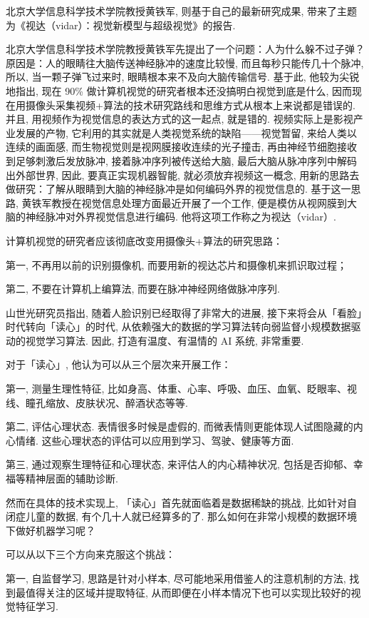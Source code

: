 北京大学信息科学技术学院教授黄铁军, 则基于自己的最新研究成果, 带来了主题为《视达（vidar）：视觉新模型与超级视觉》的报告.


北京大学信息科学技术学院教授黄铁军先提出了一个问题：人为什么躲不过子弹？原因是：人的眼睛往大脑传送神经脉冲的速度比较慢, 而且每秒只能传几十个脉冲, 所以, 当一颗子弹飞过来时, 眼睛根本来不及向大脑传输信号.
基于此, 他较为尖锐地指出, 现在 90\% 做计算机视觉的研究者根本还没搞明白视觉到底是什么, 因而现在用摄像头采集视频+算法的技术研究路线和思维方式从根本上来说都是错误的. 并且, 用视频作为视觉信息的表达方式的这一起点, 就是错的.
视频实际上是影视产业发展的产物, 它利用的其实就是人类视觉系统的缺陷——视觉暂留, 来给人类以连续的画面感, 而生物视觉则是视网膜接收连续的光子撞击, 再由神经节细胞接收到足够刺激后发放脉冲, 接着脉冲序列被传送给大脑, 最后大脑从脉冲序列中解码出外部世界,
因此, 要真正实现机器智能, 就必须放弃视频这一概念, 用新的思路去做研究：了解从眼睛到大脑的神经脉冲是如何编码外界的视觉信息的. 基于这一思路, 黄铁军教授在视觉信息处理方面最近开展了一个工作, 便是模仿从视网膜到大脑的神经脉冲对外界视觉信息进行编码. 他将这项工作称之为视达（vidar）.

计算机视觉的研究者应该彻底改变用摄像头+算法的研究思路：

第一, 不再用以前的识别摄像机, 而要用新的视达芯片和摄像机来抓识取过程；

第二, 不要在计算机上编算法, 而要在脉冲神经网络做脉冲序列.

山世光研究员指出, 随着人脸识别已经取得了非常大的进展, 接下来将会从「看脸」时代转向「读心」的时代, 从依赖强大的数据的学习算法转向弱监督小规模数据驱动的视觉学习算法. 因此, 打造有温度、有温情的 AI 系统, 非常重要.

对于「读心」, 他认为可以从三个层次来开展工作：

第一, 测量生理性特征, 比如身高、体重、心率、呼吸、血压、血氧、眨眼率、视线、瞳孔缩放、皮肤状况、醉酒状态等等.

第二, 评估心理状态. 表情很多时候是虚假的, 而微表情则更能体现人试图隐藏的内心情绪. 这些心理状态的评估可以应用到学习、驾驶、健康等方面.

第三, 通过观察生理特征和心理状态, 来评估人的内心精神状况, 包括是否抑郁、幸福等精神层面的辅助诊断.

然而在具体的技术实现上, 「读心」首先就面临着是数据稀缺的挑战, 比如针对自闭症儿童的数据, 有个几十人就已经算多的了. 那么如何在非常小规模的数据环境下做好机器学习呢？

可以从以下三个方向来克服这个挑战：

第一, 自监督学习, 思路是针对小样本, 尽可能地采用借鉴人的注意机制的方法, 找到最值得关注的区域并提取特征, 从而即便在小样本情况下也可以实现比较好的视觉特征学习.

